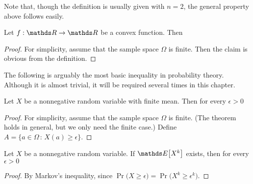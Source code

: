 \documentclass[scombinatorics.tex]{subfiles}
\begin{document}
Note that, though the definition is usually given with $n=2$, the general property above follows easily.

\begin{void_thm}\label{Jensen}
Let $f:\RR\to\RR$ be a convex function.
  Then

  {\le}
  {\Ex\Big[f(X)\Big]}
\end{void_thm}


\begin{proof}
  For simplicity, assume that the sample space $\Omega$ is finite.
  Then the claim is obvious from the definition.
\end{proof}

The following is arguably the most basic inequality in probability theory.
Although it is almost trivial, it will be required several times in this chapter. 

\begin{void_thm}\label{Markov}
  Let $X$ be a nonnegative random variable with finite mean.
  Then for every $\epsilon>0$

  {\le}
  {\frac{\Ex[X]}{\epsilon}}
\end{void_thm}

\begin{proof}
  For simplicity, assume that the sample space $\Omega$ is finite.
  (The theorem holds in general, but we only need the finite case.)
  Define $A=\{a\in\Omega\,:\, X(a)\ge\epsilon\}$.





\end{proof}

\begin{corollary}
  Let $X$ be a nonnegative random variable.
  If $\Ex\big[X^k\big]$ exists, then for every $\epsilon>0$
  
  {\le}
  {}
\end{corollary}

\begin{proof}
  By Markov's inequality, since $\Pr\big(X\ge\epsilon\big)=\Pr\big(X^k\ge\epsilon^k\big)$.
\end{proof}
\end{document}
